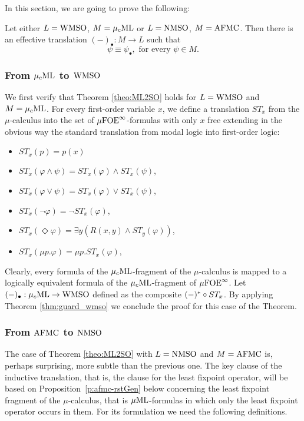 In this section, we are going to prove the following:

\begin{theorem}\label{theo:ML2SO} Let either $L=\mathrm{WMSO}$, $M=\mu_{c}\textup{ML}$ or  $L=\mathrm{NMSO}$, $M=\mathrm{AFMC}$. Then there is an effective translation  $(-)_{\bullet}:M\to L$ such that
\[\psi \equiv \psi_{\bullet}, \text{ for every } \psi \in M.\]
\end{theorem}

\subsubsection{From $\mu_{c}\textup{ML}$ to $\mathrm{WMSO}$} 
We first verify that Theorem \ref{theo:ML2SO} holds for $L=\mathrm{WMSO}$ and $M=\mu_{c}\textup{ML}$.
For every first-order variable $x$, we define a translation $ST_x$ from
the $\mu$-calculus into the set of $\mu{\ensuremath{\mathrm{FOE}}}^\infty$-formulas with only $x$ free extending in the obvious way the standard translation from modal logic into first-order logic:

\begin{itemize}
 pt
\item $ST_x(p)=p(x)$%
\item $ST_x(\varphi \land \psi)=ST_x(\varphi) \land ST_x(\psi)$,
\item $ST_x(\varphi \lor \psi)=ST_x(\varphi) \lor ST_x(\psi)$,
\item $ST_x(\lnot \varphi)= \lnot ST_x(\varphi)$,
\item $ST_x(\Diamond \varphi)=\exists y (R(x,y) \land ST_y(\varphi))$,
\item $ST_x(\mu p. \varphi)= \mu p. ST_x(\varphi)$,
\end{itemize}
Clearly, every formula of the $\mu_{c}\textup{ML}$-fragment of the $\mu$-calculus is mapped to a logically equivalent formula of the $\mu_{c}\textup{ML}$-fragment of $\mu{\ensuremath{\mathrm{FOE}}}^\infty$. Let
 $(-)_{\bullet}:\mu_{c}\textup{ML}\to\mathrm{WMSO}$ defined as the composite $(-)^* \circ ST_x$. By applying Theorem \ref{thm:guard_wmso} we conclude the proof for this case of the Theorem.



\subsubsection{From $\mathrm{AFMC}$ to $\mathrm{NMSO}$}
The case of Theorem \ref{theo:ML2SO} with $L=\mathrm{NMSO}$ and $M=\mathrm{AFMC}$ is, perhaps surprising, more subtle than the previous one. The key clause of the inductive translation, that is, the clause for the
least fixpoint operator, will be based on Proposition~\ref{p:afmc-rstGen} below concerning the least fixpoint fragment of the $\mu$-calculus, that is $\mu\mathrm{ML}$-formulas in which only the least fixpoint operator occurs in them.
For its formulation we need the following definitions.

